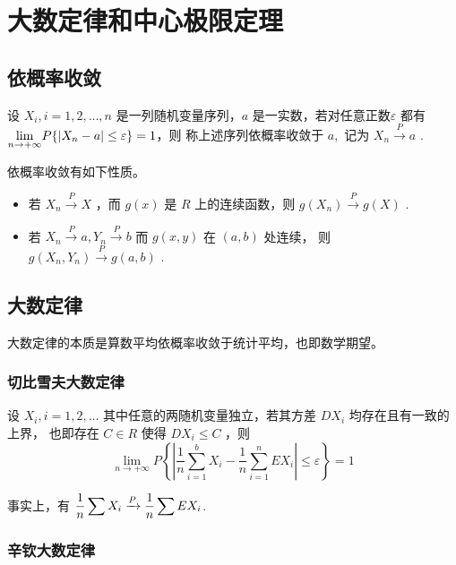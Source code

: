 \chapter{大数定律和中心极限定理}

\section{依概率收敛}

\begin{Def}[依概率收敛]

    设 $ X_i,i=1,2,\dots,n $ 是一列随机变量序列，$ a $ 是一实数，\newline 若对任意正数$ \varepsilon $ 都有
    $ \displaystyle {\displaystyle\lim_{n\rightarrow +\infty}}P\{|X_n-a|\leq\varepsilon\} = 1 $，则
    称上述序列依概率收敛于 $ a, $ 记为 $ X_n\xrightarrow{P}a $ .
\end{Def}

依概率收敛有如下性质。
\begin{itemize}
    \item 若 $ X_n\xrightarrow{P}X $ ，而 $ g(x) $ 是 $ R $ 上的连续函数，则
    $ g(X_n)\xrightarrow{P}g(X) $ .
    \item 若 $ X_n\xrightarrow{P}a,Y_n\xrightarrow{P}b $ 而 $ g(x,y) $ 在 $ (a,b) $ 处连续，
    则 $ g(X_n,Y_n)\xrightarrow{P}g(a,b) $ .
\end{itemize}

\section{大数定律}

大数定律的本质是算数平均依概率收敛于统计平均，也即数学期望。

\subsection{切比雪夫大数定律}

设 $ X_i,i=1,2,\dots $ 其中任意的两随机变量独立，若其方差 $ DX_i $ 均存在且有一致的上界，
也即存在 $ C\in R $ 使得 $ DX_i\leq C $ ，则$$
    {\displaystyle\lim_{n\rightarrow +\infty}}P\left\{
        \left|\dfrac{1}{n}\sum_{i=1}^bX_i - \dfrac{1}{n}\sum_{i=1}^nEX_i\right|\leq \varepsilon
    \right\} = 1
$$ 

事实上，有 $ \displaystyle \dfrac{1}{n}\sum X_i\xrightarrow{P}\dfrac{1}{n}\sum EX_i $.

\subsection{辛钦大数定律}

